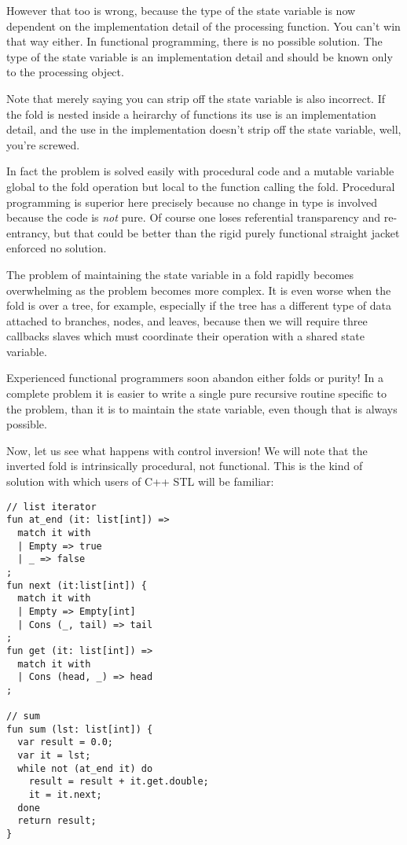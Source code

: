 \documentclass{article}
\begin{document}
However that too is wrong, because the type of the state
variable is now dependent on the implementation detail
of the processing function. You can't win that way either.
In functional programming, there is no possible solution.
The type of the state variable is an implementation detail
and should be known only to the processing object.

Note that merely saying you can strip off the state variable
is also incorrect. If the fold is nested inside a heirarchy
of functions its use is an implementation detail, and the 
use in the implementation doesn't strip off the state
variable, well, you're screwed.

In fact the problem is solved easily with procedural
code and a mutable variable global to the fold operation
but local to the function calling the fold. Procedural
programming is superior here precisely because no change
in type is involved because the code is {\em not} pure.
Of course one loses referential transparency and re-entrancy,
but that could be better than the rigid purely functional
straight jacket enforced no solution.

The problem of maintaining the state variable in a fold
rapidly becomes overwhelming as the problem becomes more
complex. It is even worse when the fold is over a tree,
for example, especially if the tree has a different type
of data attached to branches, nodes, and leaves, because
then we will require three callbacks slaves which must
coordinate their operation with a shared state variable.

Experienced functional programmers soon abandon either folds
or purity! In a complete problem it is easier to write a
single pure recursive routine specific to the problem,
than it is to maintain the state variable, even though that
is always possible.

Now, let us see what happens with control inversion!
We will note that the inverted fold is intrinsically
procedural, not functional. This is the kind of solution
with which users of C++ STL will be familiar:

\begin{verbatim}
// list iterator
fun at_end (it: list[int]) => 
  match it with
  | Empty => true
  | _ => false
;
fun next (it:list[int]) {
  match it with
  | Empty => Empty[int]
  | Cons (_, tail) => tail
;
fun get (it: list[int]) =>
  match it with
  | Cons (head, _) => head
;

// sum
fun sum (lst: list[int]) {
  var result = 0.0;
  var it = lst;
  while not (at_end it) do
    result = result + it.get.double;
    it = it.next;
  done
  return result;
}
\end{verbatim}
\end{document}
